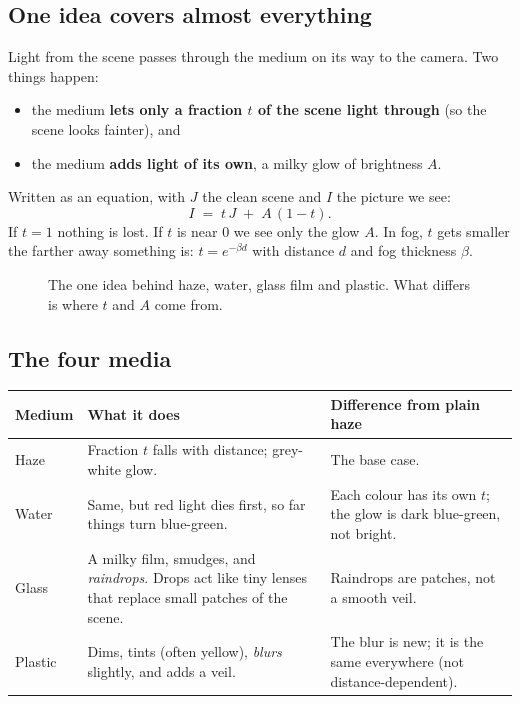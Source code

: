 \documentclass[10pt,a4paper]{article}
\begin{document}
\subsection{One idea covers almost everything}
Light from the scene passes through the medium on its way to the camera. Two things happen:
\begin{itemize}
\item the medium \textbf{lets only a fraction $t$ of the scene light through} (so the scene looks fainter), and
\item the medium \textbf{adds light of its own}, a milky glow of brightness $A$.
\end{itemize}
Written as an equation, with $J$ the clean scene and $I$ the picture we see:
\begin{equation}
I \;=\; t\,J \;+\; A\,(1-t).
\end{equation}
If $t=1$ nothing is lost. If $t$ is near 0 we see only the glow $A$. In fog, $t$ gets smaller the farther away something is: $t=e^{-\beta d}$ with distance $d$ and fog thickness $\beta$.

\begin{figure}[H]\centering
{}
\caption{The one idea behind haze, water, glass film and plastic. What differs is where $t$ and $A$ come from.}\end{figure}

\subsection{The four media}
\begin{center}\small\begin{tabular}{p{2.1cm}p{6.2cm}p{7.3cm}}\toprule
Medium & What it does & Difference from plain haze\\\midrule
Haze & Fraction $t$ falls with distance; grey-white glow. & The base case.\\
Water & Same, but red light dies first, so far things turn blue-green. & Each colour has its own $t$; the glow is dark blue-green, not bright.\\
Glass & A milky film, smudges, and \emph{raindrops}. Drops act like tiny lenses that replace small patches of the scene. & Raindrops are patches, not a smooth veil.\\
Plastic & Dims, tints (often yellow), \emph{blurs} slightly, and adds a veil. & The blur is new; it is the same everywhere (not distance-dependent).\\\bottomrule
\end{tabular}\end{center}
\end{document}
